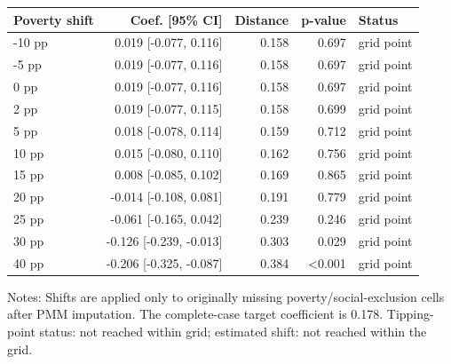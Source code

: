 \begin{tabular}{@{}lrrrl@{}}
\toprule
Poverty shift & Coef. [95\% CI] & Distance & p-value & Status \\
\midrule
-10 pp & 0.019 [-0.077, 0.116] & 0.158 & 0.697 & grid point \\
-5 pp & 0.019 [-0.077, 0.116] & 0.158 & 0.697 & grid point \\
0 pp & 0.019 [-0.077, 0.116] & 0.158 & 0.697 & grid point \\
2 pp & 0.019 [-0.077, 0.115] & 0.158 & 0.699 & grid point \\
5 pp & 0.018 [-0.078, 0.114] & 0.159 & 0.712 & grid point \\
10 pp & 0.015 [-0.080, 0.110] & 0.162 & 0.756 & grid point \\
15 pp & 0.008 [-0.085, 0.102] & 0.169 & 0.865 & grid point \\
20 pp & -0.014 [-0.108, 0.081] & 0.191 & 0.779 & grid point \\
25 pp & -0.061 [-0.165, 0.042] & 0.239 & 0.246 & grid point \\
30 pp & -0.126 [-0.239, -0.013] & 0.303 & 0.029 & grid point \\
40 pp & -0.206 [-0.325, -0.087] & 0.384 & <0.001 & grid point \\
\bottomrule
\end{tabular}

\vspace{0.2em}
\begin{minipage}{0.92\textwidth}\scriptsize Notes: Shifts are applied only to originally missing poverty/social-exclusion cells after PMM imputation. The complete-case target coefficient is 0.178. Tipping-point status: not reached within grid; estimated shift: not reached within the grid.\end{minipage}
